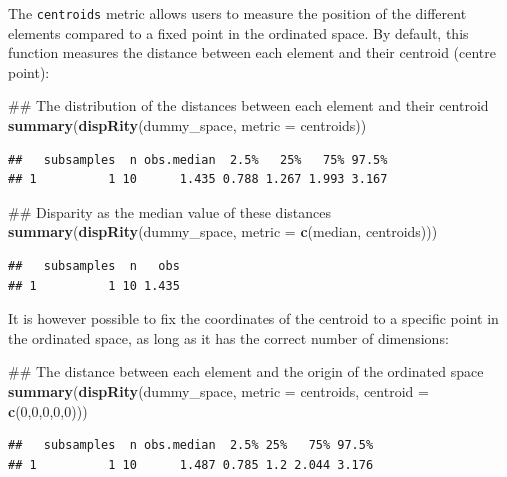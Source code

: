 \documentclass[]{book}
\newenvironment{Shaded}{\begin{snugshade}}{\end{snugshade}}
\newcommand{\KeywordTok}[1]{\textcolor[rgb]{0.13,0.29,0.53}{\textbf{#1}}}
\newcommand{\DataTypeTok}[1]{\textcolor[rgb]{0.13,0.29,0.53}{#1}}
\newcommand{\DecValTok}[1]{\textcolor[rgb]{0.00,0.00,0.81}{#1}}
\newcommand{\NormalTok}[1]{#1}
\theoremstyle{definition}
\theoremstyle{definition}
\theoremstyle{remark}
\begin{document}
The \texttt{centroids} metric allows users to measure the position of
the different elements compared to a fixed point in the ordinated space.
By default, this function measures the distance between each element and
their centroid (centre point):

\begin{Shaded}
\begin{Highlighting}[]
\NormalTok{## The distribution of the distances between each element and their centroid}
\KeywordTok{summary}\NormalTok{(}\KeywordTok{dispRity}\NormalTok{(dummy_space, }\DataTypeTok{metric =}\NormalTok{ centroids))}
\end{Highlighting}
\end{Shaded}

\begin{verbatim}
##   subsamples  n obs.median  2.5%   25%   75% 97.5%
## 1          1 10      1.435 0.788 1.267 1.993 3.167
\end{verbatim}

\begin{Shaded}
\begin{Highlighting}[]
\NormalTok{## Disparity as the median value of these distances}
\KeywordTok{summary}\NormalTok{(}\KeywordTok{dispRity}\NormalTok{(dummy_space, }\DataTypeTok{metric =} \KeywordTok{c}\NormalTok{(median, centroids)))}
\end{Highlighting}
\end{Shaded}

\begin{verbatim}
##   subsamples  n   obs
## 1          1 10 1.435
\end{verbatim}

It is however possible to fix the coordinates of the centroid to a
specific point in the ordinated space, as long as it has the correct
number of dimensions:

\begin{Shaded}
\begin{Highlighting}[]
\NormalTok{## The distance between each element and the origin of the ordinated space}
\KeywordTok{summary}\NormalTok{(}\KeywordTok{dispRity}\NormalTok{(dummy_space, }\DataTypeTok{metric =}\NormalTok{ centroids, }\DataTypeTok{centroid =} \KeywordTok{c}\NormalTok{(}\DecValTok{0}\NormalTok{,}\DecValTok{0}\NormalTok{,}\DecValTok{0}\NormalTok{,}\DecValTok{0}\NormalTok{,}\DecValTok{0}\NormalTok{)))}
\end{Highlighting}
\end{Shaded}

\begin{verbatim}
##   subsamples  n obs.median  2.5% 25%   75% 97.5%
## 1          1 10      1.487 0.785 1.2 2.044 3.176
\end{verbatim}
\end{document}
